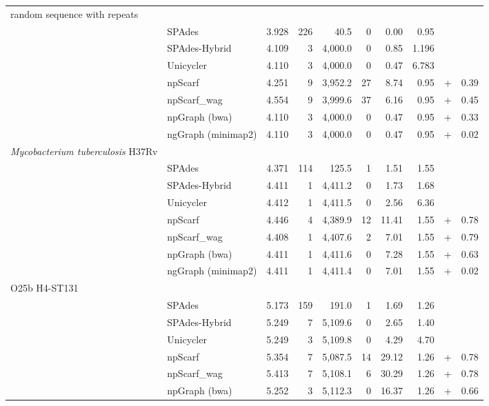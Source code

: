 \begin{longtable}{llcrrrrr@{\hspace{2pt}}c@{\hspace{2pt}}r}
\rowcolor{Gray} \multicolumn{10}{l}
{ random sequence with repeats} \\*  
 & SPAdes  & 3.928 & 226  & 40.5  &  0 &  0.00 &  0.95 &  &  \\*
 & SPAdes-Hybrid  & 4.109 & 3  & 4,000.0  & 0  & 0.85  & 1.196  &  &  \\*
 & Unicycler  & 4.110 & 3  & 4,000.0  &  0 &  0.47 & 6.783  &  &  \\*
 & npScarf  & 4.251 &  9 & 3,952.2  &  27 &  8.74 &  0.95 & + & 0.39 \\*
 & npScarf\_wag & 4.554 & 9  &  3,999.6 &  37 &  6.16 &  0.95 & + &  0.45\\*
 & npGraph (bwa)  & 4.110 & 3  & 4,000.0  & 0  &  0.47 &  0.95 & + &  0.33\\*
 & ngGraph (minimap2)  & 4.110 & 3  & 4,000.0  & 0  & 0.47  &  0.95 & + &  0.02\\
\rowcolor{Gray} \multicolumn{10}{l}
{\emph{Mycobacterium tuberculosis} H37Rv} \\*  
 & SPAdes  & 4.371 & 114  &  125.5 &  1 & 1.51  &  1.55 &  &  \\*
 & SPAdes-Hybrid  & 4.411 & 1  & 4,411.2  & 0  & 1.73  & 1.68  &  &  \\*
 & Unicycler  & 4.412 &  1 &  4,411.5 & 0  &  2.56 &  6.36 &  &  \\*
 & npScarf  & 4.446 & 4  & 4,389.9  & 12  &  11.41 & 1.55  & + & 0.78 \\*
 & npScarf\_wag  & 4.408 & 1  & 4,407.6  &  2 &  7.01 & 1.55  & + & 0.79 \\*
 & npGraph (bwa)  & 4.411 &  1 & 4,411.6  &  0 & 7.28  &  1.55 & + & 0.63 \\*
 & ngGraph (minimap2)  & 4.411 & 1 & 4,411.4  &  0 &  7.01 & 1.55  & + &  0.02\\
\rowcolor{Gray} \multicolumn{10}{l}
{\ec{} O25b H4-ST131} \\*  
 & SPAdes  & 5.173 &  159 & 191.0  &  1 &  1.69 & 1.26  &  &  \\*
 & SPAdes-Hybrid  & 5.249 &  7 &  5,109.6 & 0  & 2.65  & 1.40  &  &  \\*
 & Unicycler  & 5.249 &  3 & 5,109.8  &  0 &  4.29 &  4.70 &  &  \\*
 & npScarf  & 5.354 & 7  & 5,087.5  &  14 & 29.12  &  1.26 & + &  0.78\\*
 & npScarf\_wag  & 5.413 &  7 & 5,108.1  & 6  &  30.29 & 1.26  & + & 0.78 \\*
 & npGraph (bwa)  & 5.252 & 3  &  5,112.3 &  0 & 16.37  & 1.26  & + &  0.66\\*

\end{longtable}
